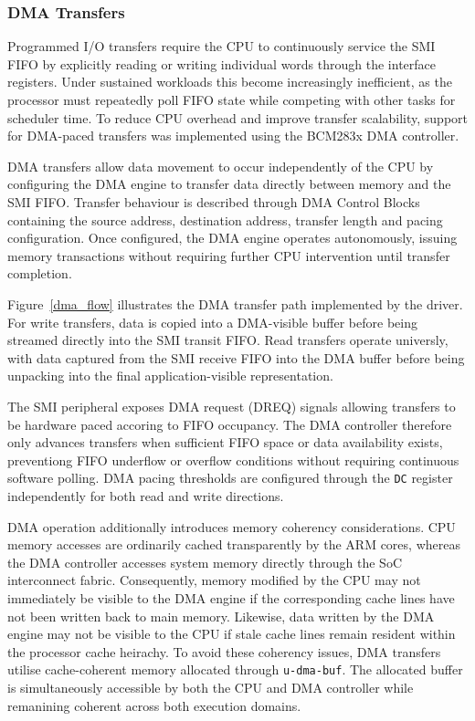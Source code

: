 \documentclass[final]{cmpreport}
\begin{document}
\subsubsection{DMA Transfers}\label{sec_dma_transfers}
Programmed I/O transfers require the CPU to continuously service the SMI FIFO by explicitly reading or writing individual words through the interface registers. Under sustained workloads this become increasingly inefficient, as the processor must repeatedly poll FIFO state while competing with other tasks for scheduler time. To reduce CPU overhead and improve transfer scalability, support for DMA-paced transfers was implemented using the BCM283x DMA controller.

DMA transfers allow data movement to occur independently of the CPU by configuring the DMA engine to transfer data directly between memory and the SMI FIFO. Transfer behaviour is described through DMA Control Blocks containing the source address, destination address, transfer length and pacing configuration. Once configured, the DMA engine operates autonomously, issuing memory transactions without requiring further CPU intervention until transfer completion.

Figure~\ref{dma_flow} illustrates the DMA transfer path implemented by the driver. For write transfers, data is copied into a DMA-visible buffer before being streamed directly into the SMI transit FIFO. Read transfers operate universly, with data captured from the SMI receive FIFO into the DMA buffer before being unpacking into the final application-visible representation.

The SMI peripheral exposes DMA request (DREQ) signals allowing transfers to be hardware paced accoring to FIFO occupancy. The DMA controller therefore only advances transfers when sufficient FIFO space or data availability exists, preventiong FIFO underflow or overflow conditions without requiring continuous software polling. DMA pacing thresholds are configured through the \texttt{DC} register independently for both read and write directions.

DMA operation additionally introduces memory coherency considerations. CPU memory accesses are ordinarily cached transparently by the ARM cores, whereas the DMA controller accesses system memory directly through the SoC interconnect fabric. Consequently, memory modified by the CPU may not immediately be visible to the DMA engine if the corresponding cache lines have not been written back to main memory. Likewise, data written by the DMA engine may not be visible to the CPU if stale cache lines remain resident within the processor cache heirachy. To avoid these coherency issues, DMA transfers utilise cache-coherent memory allocated through \texttt{u-dma-buf}. The allocated buffer is simultaneously accessible by both the CPU and DMA controller while remanining coherent across both execution domains.
\end{document}

